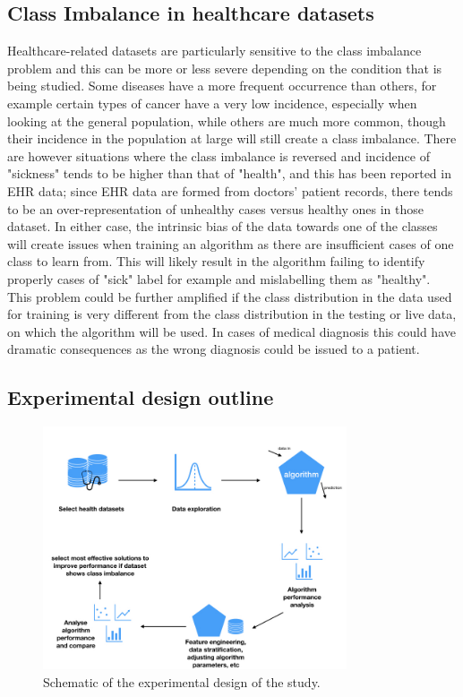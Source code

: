 \subsection{Class Imbalance in healthcare datasets}
Healthcare-related datasets are particularly sensitive to the class imbalance problem and this can be more or less severe depending on the condition that is being studied. Some diseases have a more frequent occurrence than others, for example certain types of cancer have a very low incidence, especially when looking at the general population, while others are much more common, though their incidence in the population at large will still create a class imbalance. There are however situations where the class imbalance is reversed and incidence of "sickness" tends to be higher than that of "health", and this has been reported in EHR data; since EHR data are formed from doctors' patient records, there tends to be an over-representation of unhealthy cases versus healthy ones in those dataset. In either case, the intrinsic bias of the data towards one of the classes will create issues when training an algorithm as there are insufficient cases of one class to learn from. This will likely result in the algorithm failing to identify properly cases of "sick" label for example and mislabelling them as "healthy". This problem could be further amplified if the class distribution in the data used for training is very different from the class distribution in the testing or live data, on which the algorithm will be used.
In cases of medical diagnosis this could have dramatic consequences as the wrong diagnosis could be issued to a patient. 


\subsection{Experimental design outline}


\begin{figure}[H]
    \centering
    \includegraphics[width=0.8\textwidth]{ThesisTemplate/usingLatex/images/Chapter3Figures001.jpeg}
    \caption{Schematic of the experimental design of the study.}
    \label{fig:expDesign}
\end{figure}

